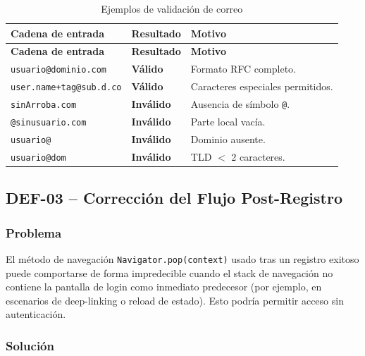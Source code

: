 \documentclass[12pt,a4paper]{article}
\begin{document}
\begin{longtable}{p{5cm} p{3.5cm} p{5cm}}
\caption{Ejemplos de validación de correo} \label{tab:email-validacion} \\
\toprule
\textbf{Cadena de entrada} & \textbf{Resultado} & \textbf{Motivo} \\
\midrule
\endfirsthead
\toprule
\textbf{Cadena de entrada} & \textbf{Resultado} & \textbf{Motivo} \\
\midrule
\endhead
\bottomrule
\endlastfoot
\texttt{usuario@dominio.com}  & \textcolor{normalgreen}{\textbf{Válido}}   & Formato RFC completo. \\
\texttt{user.name+tag@sub.d.co}& \textcolor{normalgreen}{\textbf{Válido}}  & Caracteres especiales permitidos. \\
\texttt{sinArroba.com}        & \textcolor{criticalred}{\textbf{Inválido}} & Ausencia de símbolo \texttt{@}. \\
\texttt{@sinusuario.com}      & \textcolor{criticalred}{\textbf{Inválido}} & Parte local vacía. \\
\texttt{usuario@}             & \textcolor{criticalred}{\textbf{Inválido}} & Dominio ausente. \\
\texttt{usuario@dom}          & \textcolor{criticalred}{\textbf{Inválido}} & TLD $<$ 2 caracteres. \\
\end{longtable}

\subsection{DEF-03 -- Corrección del Flujo Post-Registro}

\subsubsection{Problema}

El método de navegación \texttt{Navigator.pop(context)} usado tras un registro exitoso
puede comportarse de forma impredecible cuando el stack de navegación no contiene la pantalla
de login como inmediato predecesor (por ejemplo, en escenarios de deep-linking o reload
de estado). Esto podría permitir acceso sin autenticación.

\subsubsection{Solución}
\end{document}
